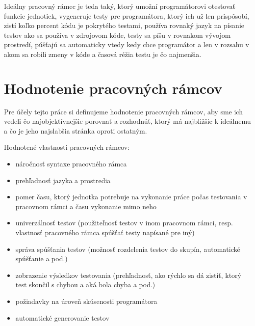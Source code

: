 \documentclass[11pt,twoside,slovak,a4paper]{article}
\begin{document}
		Ideálny pracovný rámec je teda taký, ktorý umožní programátorovi otestovať funkcie jednotiek, vygeneruje testy pre programátora, ktorý ich už len prispôsobí, zistí koľko percent kódu je pokrytého testami, používa rovnaký jazyk na písanie testov ako sa používa v zdrojovom kóde, testy sa píšu v rovnakom vývojom prostredí, púšťajú sa automaticky vtedy kedy chce programátor a len v rozsahu v akom sa robili zmeny v kóde a časová réžia testu je čo najmenšia.
	
	\newpage
	\section{Hodnotenie pracovných rámcov}	
	Pre účely tejto práce si definujeme hodnotenie pracovných rámcov, aby sme ich vedeli čo najobjektívnejšie porovnať a rozhodnúť, ktorý má najbližšie k ideálnemu a čo je jeho najslabšia stránka oproti ostatným.
	
	Hodnotené vlastnosti pracovných rámcov:
	\begin{itemize}
		\item náročnosť syntaxe pracovného rámca
		\item prehľadnosť jazyka a prostredia
		\item pomer času, ktorý jednotka potrebuje na vykonanie práce počas testovania v pracovnom rámci a času vykonanie mimo neho
		\item univerzálnosť testov (použiteľnosť testov v inom pracovnom rámci, resp. vlastnosť pracovného rámca spúšťať testy napísané pre iný)
		\item správa spúšťania testov (možnosť rozdelenia testov do skupín, automatické spúšťanie a pod.)
		\item zobrazenie výsledkov testovania (prehľadnosť, ako rýchlo sa dá zistiť, ktorý test skončil s chybou a aká bola chyba a pod.)
		\item požiadavky na úroveň skúsenosti programátora
		\item automatické generovanie testov
	\end{itemize}
	
\end{document}
